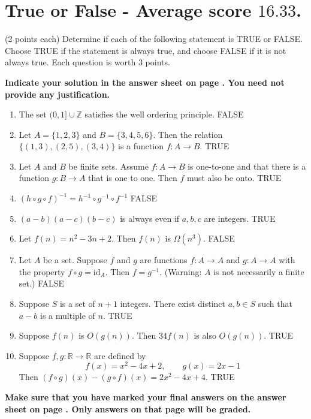 \documentclass[12pt]{article}
\begin{document}
\newpage
\section*{True or False - Average score $16.33$.}

(2 points each) Determine if each of the following statement is TRUE or FALSE.\\Choose TRUE if the statement is always true, and choose FALSE if it is not always true. Each question is worth 3 points.

\vspace{0.2cm}

\noindent
\textbf{Indicate your solution in the answer sheet on page \pageref{answersheet}.  You need not provide any justification.}


\begin{enumerate}
\item The set $(0,1]\cup\mathbb{Z}$ satisfies the well ordering principle. FALSE
\vspace{0.8cm}
\item Let $A=\{1,2,3\}$ and $B=\{3,4,5,6\}$. Then the relation $\{(1,3), (2,5), (3,4)\}$ is a function $f:A\to B$. TRUE
\vspace{0.8cm}
\item Let $A$ and $B$ be finite sets. Assume $f:A\to B$ is one-to-one and that there is a function $g:B\to A$ that is one to one. Then $f$ must also be onto. TRUE
\vspace{0.8cm}
\item $(h\circ g\circ f)^{-1}=h^{-1}\circ g^{-1}\circ f^{-1}$ FALSE
\vspace{0.8cm}
\item $(a-b)(a-c)(b-c)$ is always even if $a,b,c$ are integers. TRUE
\vspace{0.8cm}
\item Let $f(n)=n^2-3n+2$. Then $f(n)$ is $\Omega(n^3)$. FALSE
\vspace{0.8cm}
\item Let $A$ be a set. Suppose $f$ and $g$ are functions $f:A\to A$ and $g:A\to A$ with the property $f\circ g=\textrm{id}_A$. Then $f=g^{-1}$. (Warning: $A$ is not necessarily a finite set.) FALSE
\vspace{0.8cm}
\item Suppose $S$ is a set of $n + 1$ integers. There exist distinct $a, b \in S$ such that $a - b$ is a multiple of $n$. TRUE
\vspace{0.8cm}
\item Suppose $f(n)$ is $O(g(n))$. Then $34 f(n)$ is also $O(g(n))$. TRUE
\vspace{0.8cm}
\item Suppose $f,g:\mathbb{R}\to\mathbb{R}$ are defined by
\[
f(x)=x^2-4x+2,\qquad g(x)=2x-1
\]
Then $(f\circ g)(x)-(g\circ f)(x)=2x^2-4x+4$. TRUE
\end{enumerate}
\begin{center}
\textbf{Make sure that you have marked your final answers on the answer sheet on page \pageref{answersheet}. Only answers on that page will be graded.}
\end{center}
\newpage
\end{document}
